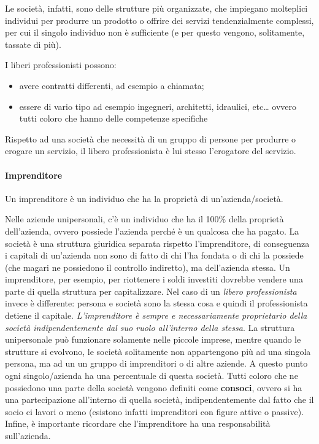 \noindent Le società, infatti, sono delle strutture più organizzate, che
impiegano molteplici individui per produrre un prodotto o offrire dei servizi
tendenzialmente complessi, per cui il singolo individuo non è
sufficiente (e per questo vengono, solitamente, tassate di più).

I liberi professionisti possono:
\begin{itemize}
  \item avere contratti differenti, ad esempio a chiamata;
  \item essere di vario tipo ad esempio ingegneri, architetti, idraulici,
  etc\dots{} ovvero tutti coloro che hanno delle competenze specifiche
\end{itemize}
Rispetto ad una società che necessità di un gruppo di persone per produrre o
erogare un servizio, il libero professionista è lui stesso l'erogatore del
servizio.

\paragraph*{Imprenditore}
\begin{definition}[Imprenditore]
Un imprenditore è un individuo che ha la proprietà di un'azienda/società.
\end{definition}
\noindent Nelle aziende unipersonali, c'è un individuo che ha il 100\% della
proprietà dell'azienda, ovvero possiede l'azienda perché è un qualcosa che ha
pagato. La società è una struttura giuridica separata rispetto l'imprenditore,
di conseguenza i capitali di un'azienda non sono di fatto di chi l'ha fondata o
di chi la possiede (che magari ne possiedono il controllo indiretto), ma
dell'azienda stessa. Un imprenditore, per esempio, per riottenere i soldi
investiti dovrebbe vendere una parte di quella struttura per capitalizzare. Nel
caso di un \textit{libero professionista} invece è differente: persona e
società sono la stessa cosa e quindi il professionista detiene il capitale.
\textit{L'imprenditore è sempre e necessariamente proprietario della società
indipendentemente dal suo ruolo all'interno della stessa}.
La struttura unipersonale può funzionare solamente nelle piccole imprese,
mentre quando le strutture si evolvono, le società solitamente non appartengono
più ad una singola persona, ma ad un un gruppo di imprenditori o di altre
aziende. A questo punto ogni singolo/azienda ha una percentuale di questa
società. Tutti coloro che ne possiedono una parte della società vengono
definiti come \textbf{consoci}, ovvero si ha una partecipazione all'interno di
quella società, indipendentemente dal fatto che il socio ci lavori o meno
(esistono infatti imprenditori con figure attive o passive). Infine, è
importante ricordare che l'imprenditore ha una responsabilità sull'azienda.

